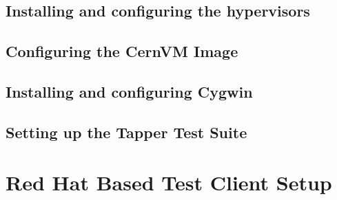 \newpage
\subsection{Installing and configuring the hypervisors}
\subsection{Configuring the CernVM Image}
\subsection{Installing and configuring Cygwin}
%
\subsection{Setting up the Tapper Test Suite}




\newpage
\section{Red Hat Based Test Client Setup}
